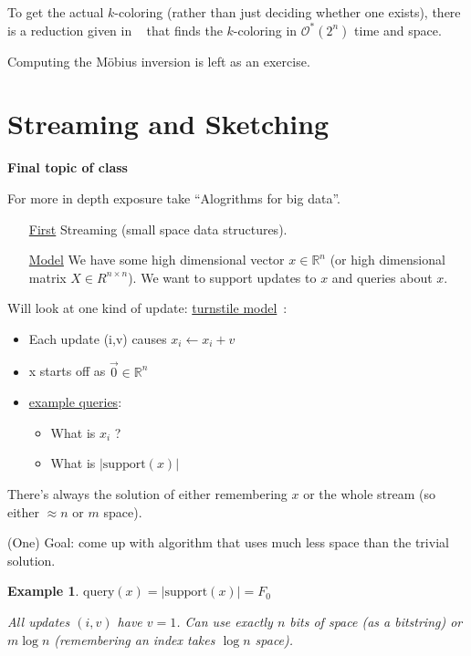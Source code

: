 \documentclass[11pt]{article}
\newcommand{\R}{\mathbb{R}}
\newtheorem{example}[theorem]{Example}
\newcommand{\Oh}{\mathcal{O}}
\newcommand{\Ohstar}{\Oh^\ast}
\newcommand{\query}{\text{query}}
\newcommand{\support}{\text{support}}
\begin{document}
To get the actual $k$-coloring (rather than just deciding whether one exists), there is a reduction given in ~\cite{BjorklundH06} that finds the $k$-coloring in $\Ohstar(2^n)$ time and space.

Computing the M\"obius inversion is left as an exercise.

\section*{Streaming and Sketching}
\begin{center}
\textbf{Final topic of class}
\end{center}

For more in depth exposure take ``Alogrithms for big data''.

\begin{itemize}
\item[\underline{First}] Streaming (small space data structures).
\item[\underline{Model}] We have some high dimensional vector $x \in \R^n$ (or high dimensional matrix $X \in R^{n\times n}$). We want to support updates to $x$ and queries about $x$.
\end{itemize}

\par
Will look at one kind of update: \underline{turnstile model}~\cite{muthukrishnan2005data}:

\begin{itemize}
\item Each update (i,v) causes $x_i \leftarrow x_i + v$
\item x starts off as $\vec{0} \in \R^n$
\item \underline{example queries}: \begin{itemize}
    \item What is $x_i$ ?
    \item What is $|\support(x)|$
\end{itemize}
\end{itemize}

There's always the solution of either remembering $x$ or the whole stream (so either $\approx n$ or $m$ space). 

(One) Goal: come up with algorithm that uses much less space than the trivial solution.

\begin{example}
$\query(x) = |\support(x)| = F_0$

All updates $(i,v)$ have $v=1$. Can use exactly $n$ bits of space (as a bitstring) or $m \log n$ (remembering an index takes $\log n$ space).
\end{example}
\end{document}
